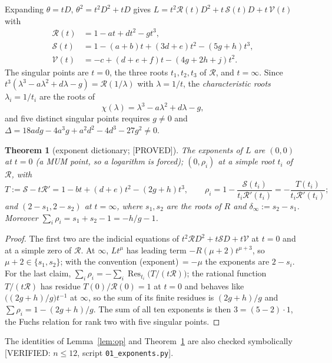 \documentclass[11pt,reqno]{amsart}
\theoremstyle{plain}
\newtheorem{theorem}{Theorem}[section]
\theoremstyle{definition}
\theoremstyle{remark}
\theoremstyle{plain}
\DeclareMathOperator{\Res}{Res}
\newcommand{\Rc}{\mathcal R}
\newcommand{\Sc}{\mathcal S}
\newcommand{\Vc}{\mathcal V}
\newcommand{\Proved}{\textup{\textsf{[PROVED]}}}
\newcommand{\Verified}[1]{\textup{\textsf{[VERIFIED: #1]}}}
\begin{document}
Expanding $\theta=tD$, $\theta^2=t^2D^2+tD$ gives
$L=t^2\Rc(t)D^2+t\,\Sc(t)D+t\,\Vc(t)$ with
\begin{equation}\label{eq:RSV}
\begin{aligned}
\Rc(t)&=1-at+dt^2-gt^3,\\
\Sc(t)&=1-(a+b)t+(3d+e)t^2-(5g+h)t^3,\\
\Vc(t)&=-c+(d+e+f)t-(4g+2h+j)t^2 .
\end{aligned}
\end{equation}
The singular points are $t=0$, the three roots $t_1,t_2,t_3$ of $\Rc$, and
$t=\infty$. Since $t^3(\lambda^3-a\lambda^2+d\lambda-g)=\Rc(1/\lambda)$ with
$\lambda=1/t$, the \emph{characteristic roots} $\lambda_i=1/t_i$ are the roots of
\begin{equation}\label{eq:chi}
\chi(\lambda)=\lambda^3-a\lambda^2+d\lambda-g ,
\end{equation}
and five distinct singular points requires $g\ne0$ and
$\Delta=18adg-4a^3g+a^2d^2-4d^3-27g^2\ne0$.

\begin{theorem}[exponent dictionary; \Proved]\label{thm:F1}
The exponents of $L$ are $(0,0)$ at $t=0$ \textup{(}a MUM point, so a logarithm
is forced\textup{)}; $(0,\rho_i)$ at a simple root $t_i$ of $\Rc$, with
\[
T:=\Sc-t\Rc'=1-bt+(d+e)t^2-(2g+h)t^3,\qquad
\rho_i=1-\frac{\Sc(t_i)}{t_i\Rc'(t_i)}=-\frac{T(t_i)}{t_i\Rc'(t_i)} ;
\]
and $(2-s_1,2-s_2)$ at $t=\infty$, where $s_1,s_2$ are the roots of $R$ and
$\delta_\infty:=s_2-s_1$. Moreover $\sum_i\rho_i=s_1+s_2-1=-h/g-1$.
\end{theorem}

\begin{proof}
The first two are the indicial equations of $t^2\Rc D^2+t\Sc D+t\Vc$ at $t=0$ and
at a simple zero of $\Rc$. At $\infty$, $Lt^{\mu}$ has leading term
$-R(\mu+2)t^{\mu+3}$, so $\mu+2\in\{s_1,s_2\}$; with the convention
(exponent)$\,=-\mu$ the exponents are $2-s_i$. For the last claim,
$\sum_i\rho_i=-\sum_i\Res_{t_i}\bigl(T/(t\Rc)\bigr)$; the rational function
$T/(t\Rc)$ has residue $T(0)/\Rc(0)=1$ at $t=0$ and behaves like
$\bigl((2g+h)/g\bigr)t^{-1}$ at $\infty$, so the sum of its finite residues is
$(2g+h)/g$ and $\sum\rho_i=1-(2g+h)/g$. The sum of all ten exponents is then
$3=(5-2)\cdot1$, the Fuchs relation for rank two with five singular points.
\end{proof}

The identities of Lemma~\ref{lem:op} and Theorem~\ref{thm:F1} are also checked
symbolically \Verified{$n\le12$, script \texttt{01\_exponents.py}}.
\end{document}
